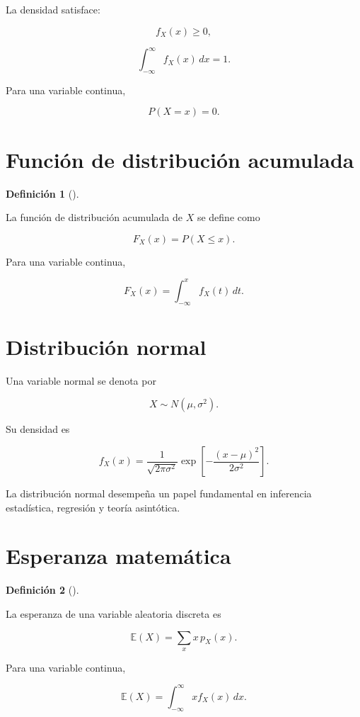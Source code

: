 \documentclass[
  spanish,
  11pt,
  letterpaper,
  DIV=11,
  numbers=noendperiod]{scrreprt}
\theoremstyle{definition}
\newtheorem{definition}{Definición}[chapter]
\theoremstyle{plain}
\theoremstyle{definition}
\theoremstyle{remark}
\begin{document}
La densidad satisface:

\[
f_X(x)\geq 0,
\]

\[
\int_{-\infty}^{\infty}f_X(x)\,dx=1.
\]

Para una variable continua,

\[
P(X=x)=0.
\]

\section{Función de distribución
acumulada}\label{funciuxf3n-de-distribuciuxf3n-acumulada}

\begin{definition}[]\protect\hypertarget{def-funcion-distribucion}{}\label{def-funcion-distribucion}

La función de distribución acumulada de \(X\) se define como

\[
F_X(x)
=
P(X\leq x).
\]

\end{definition}

Para una variable continua,

\[
F_X(x)
=
\int_{-\infty}^{x}
f_X(t)\,dt.
\]

\section{Distribución normal}\label{distribuciuxf3n-normal}

Una variable normal se denota por

\[
X\sim N(\mu,\sigma^2).
\]

Su densidad es

\[
f_X(x)
=
\frac{1}{\sqrt{2\pi\sigma^2}}
\exp
\left[
-\frac{(x-\mu)^2}{2\sigma^2}
\right].
\]

La distribución normal desempeña un papel fundamental en inferencia
estadística, regresión y teoría asintótica.

\section{Esperanza matemática}\label{esperanza-matemuxe1tica}

\begin{definition}[]\protect\hypertarget{def-esperanza}{}\label{def-esperanza}

La esperanza de una variable aleatoria discreta es

\[
\mathbb{E}(X)
=
\sum_x x\,p_X(x).
\]

Para una variable continua,

\[
\mathbb{E}(X)
=
\int_{-\infty}^{\infty}
x f_X(x)\,dx.
\]

\end{definition}
\end{document}
